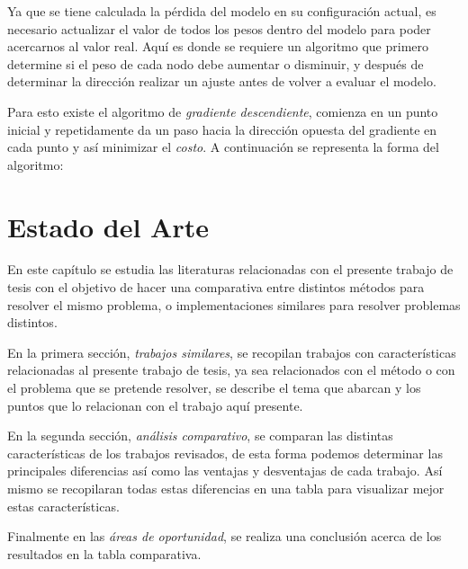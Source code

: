 Ya que se tiene calculada la pérdida del modelo en su configuración actual, es necesario actualizar el valor de todos los pesos dentro del modelo para poder acercarnos al valor real. Aquí es donde se requiere un algoritmo que primero determine si el peso de cada nodo debe aumentar o disminuir, y después de determinar la dirección realizar un ajuste antes de volver a evaluar el modelo.

Para esto existe el algoritmo de \emph{gradiente descendiente}, comienza en un punto inicial y repetidamente da un paso hacia la dirección opuesta del gradiente en cada punto y así minimizar el \emph{costo}. A continuación se representa la forma del algoritmo:




%
%           


\chapter{Estado del Arte}
En este capítulo se estudia las literaturas relacionadas con el presente trabajo de tesis con el objetivo de hacer una comparativa entre distintos métodos para resolver el mismo problema, o implementaciones similares para resolver problemas distintos.

En la primera sección, \emph{trabajos similares}, se recopilan trabajos con características relacionadas al presente trabajo de tesis, ya sea relacionados con el método o con el problema que se pretende resolver, se describe el tema que abarcan y los puntos que lo relacionan con el trabajo aquí presente.

En la segunda sección, \emph{análisis comparativo}, se comparan las distintas características de los trabajos revisados, de esta forma podemos determinar las principales diferencias así como las ventajas y desventajas de cada trabajo. Así mismo se recopilaran todas estas diferencias en una tabla para visualizar mejor estas características.

Finalmente en las \emph{áreas de oportunidad}, se realiza una conclusión acerca de los resultados en la tabla comparativa.


